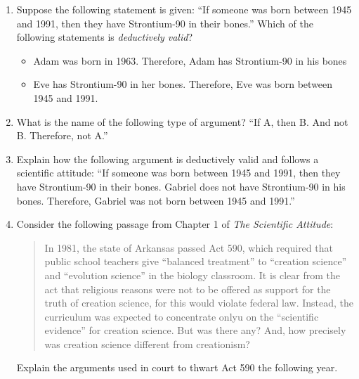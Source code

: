 \documentclass[12pt]{article}
\begin{document}
\begin{enumerate}
\item Suppose the following statement is given: ``If someone was born between 1945 and 1991, then they have Strontium-90 in their bones.''  Which of the following statements is \textit{deductively valid}?
\begin{itemize}
\item Adam was born in 1963.  Therefore, Adam has Strontium-90 in his bones
\item Eve has Strontium-90 in her bones.  Therefore, Eve was born between 1945 and 1991.
\end{itemize}
\item What is the name of the following type of argument? ``If A, then B.  And not B.  Therefore, not A.'' \\ \vspace{0.25cm}
\item Explain how the following argument is deductively valid and follows a scientific attitude: ``If someone was born between 1945 and 1991, then they have Strontium-90 in their bones.  Gabriel does not have Strontium-90 in his bones.  Therefore, Gabriel was not born between 1945 and 1991.''  \\ \vspace{1cm}
\item Consider the following passage from Chapter 1 of \textit{The Scientific Attitude}:
\begin{quotation}
In 1981, the state of Arkansas passed Act 590, which required that public school teachers give ``balanced treatment'' to ``creation science'' and ``evolution science'' in the biology classroom.  It is clear from the act that religious reasons were not to be offered as support for the truth of creation science, for this would violate federal law.  Instead, the curriculum was expected to concentrate onlyu on the ``scientific evidence'' for creation science.  But was there any?  And, how precisely was creation science different from creationism?
\end{quotation}
Explain the arguments used in court to thwart Act 590 the following year.
\end{enumerate}
\end{document}
